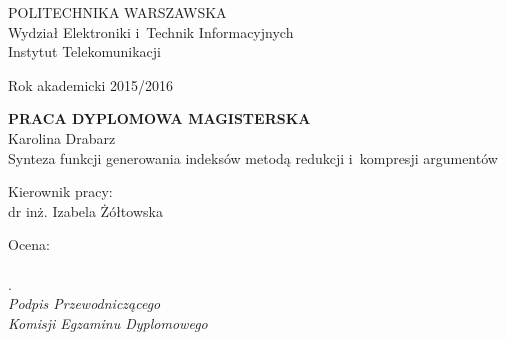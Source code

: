 	\newpage
	\thispagestyle{empty}

\begin{flushleft}
	POLITECHNIKA WARSZAWSKA\\
	Wydział Elektroniki i~Technik Informacyjnych\\
	Instytut Telekomunikacji\\
\end{flushleft}

\begin{flushright}
	Rok akademicki 2015/2016
\end{flushright}


\begin{center}
	\begin{minipage}{\textwidth}
	\begin{center}
	\Large \textbf{PRACA DYPLOMOWA MAGISTERSKA} \\
	\vspace{15pt}
	\normalsize {Karolina Drabarz} \\
	\vspace{15pt}
	\Large {Synteza funkcji generowania indeksów metodą redukcji i~kompresji argumentów} \\
	\end{center}
	\end{minipage}
\end{center}


\begin{flushright}
	Kierownik pracy:	\\
	dr inż. Izabela Żółtowska
\end{flushright}

	\hspace{5pt}

\begin{flushleft}
	\begin{minipage}{7cm}
		Ocena: \dotfill \\
		\\. \dotfill \\[-0.7cm]

		\small\textit{Podpis Przewodniczącego\\ Komisji Egzaminu Dyplomowego}
	\end{minipage}
\end{flushleft}
